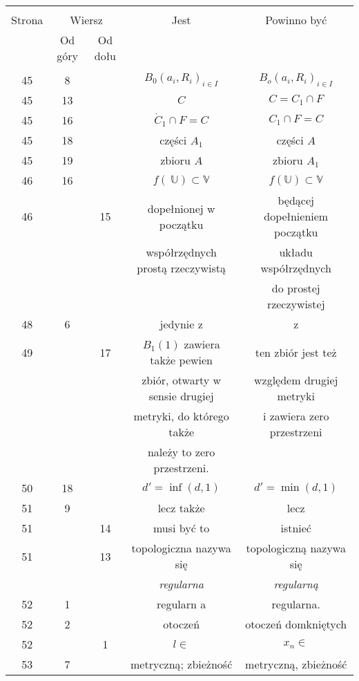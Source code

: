 \documentclass[a4paper]{article}
\newcommand{\mb}{\mathbb}
\newcommand{\V}{\mb{V}}
\newcommand{\U}{\mb{U}}
\begin{document}
\begin{center}
  \begin{tabular}{|c|c|c|c|c|}
    \hline
    & \multicolumn{2}{c|}{} & & \\
    Strona & \multicolumn{2}{c|}{Wiersz}& Jest & Powinno być \\ \cline{2-3}
    & Od góry & Od dołu &  &  \\ \hline
    & & & & \\
    45 & 8 & & $B_{ 0 }( a_{ i }, R_{ i } )_{ i \in I }$
           & $B_{ o }( a_{ i }, R_{ i } )_{ i \in I }$ \\
    45 & 13 & & $C$ & $C = C_{ 1 } \cap F$ \\
    45 & 16 & & $\dot{ C }_{ 1 } \cap F = C$ & $C_{ 1 } \cap F = C$ \\
    45 & 18 & & części $A_{ 1 }$ & części $A$ \\
    45 & 19 & & zbioru $A$ & zbioru $A_{ 1 }$ \\
    46 & 16 & & $f( \: \U ) \subset \V$ & $f( \U ) \subset \V$ \\
    46 & & 15 & dopełnionej w początku & będącej dopełnieniem początku \\
    & & & współrzędnych prostą rzeczywistą & układu współrzędnych \\
    & & & & do prostej rzeczywistej \\
    48 & 6 & & jedynie z & z \\
    49 & & 17 & $B_{ 1 }( 1 )$ zawiera także pewien & ten zbiór jest też  \\
    & & & zbiór, otwarty w sensie drugiej & względem drugiej metryki \\
    & & & metryki, do którego także & i zawiera zero przestrzeni \\
    & & & należy to zero przestrzeni. & \\
    50 & 18 & & $d' = \inf( d, 1 )$ & $d' = \min( d, 1 )$ \\
    51 & 9 & & lecz także & lecz \\
    51 & & 14 & musi być to & istnieć \\
    51 & & 13 & topologiczna nazywa się & topologiczną nazywa się \\
    & & & \emph{regularna} & \emph{regularną} \\
    52 & 1 & & regularn a & regularna. \\
    52 & 2 & & otoczeń & otoczeń domkniętych \\
    52 & & 1 & $l \in$ & $x_{ n } \in$ \\
    53 & 7 & & metryczną; zbieżność & metryczną, zbieżność \\

\end{tabular}
\end{center}
\end{document}
